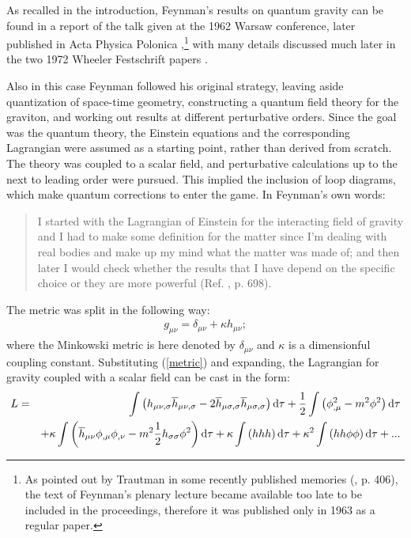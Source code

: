 \documentclass{ws-procs961x669}            %
\begin{document}
As recalled in the introduction, Feynman's results on quantum
gravity can be found in a report of the talk given at the 1962
Warsaw conference, later published in Acta Physica Polonica
\cite{Feynman:1963ax},\footnote{As pointed out by Trautman in some
recently published memories (\cite{Trautman}, p. 406), the text of
Feynman's plenary lecture became available too late to be included
in the proceedings, therefore it was published only in 1963 as a
regular paper.} with many details discussed much later in the two
1972 Wheeler Festschrift papers \cite{WheelerFest1,WheelerFest2}.

Also in this case Feynman followed his original strategy, leaving
aside quantization of space-time geometry, constructing a quantum
field theory for the graviton, and working out results at
different perturbative orders. Since the goal was the quantum
theory, the Einstein equations and the corresponding Lagrangian
were assumed as a starting point, rather than derived from
scratch. The theory was coupled to a scalar field, and
perturbative calculations up to the next to leading order were
pursued. This implied the inclusion of loop diagrams, which make
quantum corrections to enter the game. In Feynman's own words:
\begin{quote}
I started with the Lagrangian of Einstein for the interacting
field of gravity and I had to make some definition for the matter
since I'm dealing with real bodies and make up my mind what the
matter was made of; and then later I would check whether the
results that I have depend on the specific choice or they are more
powerful (Ref. , p. 698).
\end{quote}
The metric was split in the following way:
%
\begin{eqnarray}\label{metric}
g_{\mu\nu} = \delta_{\mu\nu} + \kappa h_{\mu\nu};
\end{eqnarray}
%
where the Minkowski metric is here denoted by $\delta_{\mu\nu}$
and $\kappa$ is a dimensionful coupling constant. Substituting
(\ref{metric}) and expanding, the Lagrangian for gravity coupled
with a scalar field can be cast in the form:
%
\begin{eqnarray} \label{lagrangian}
L &=& \int  \left(h_{\mu\nu,\sigma} \overline{h}_{\mu\nu,\sigma} - 2 \overline{h}_{\mu\sigma,\sigma}\overline{h}_{\mu\sigma,\sigma}\right) {\rm d} \tau + \frac{1}{2} \int \left( \phi_{,\mu}^2 - m^2 \phi^2 \right) {\rm d} \tau \\
& & + \kappa \int
\left(\overline{h}_{\mu\nu}\phi_{,\mu}\phi_{,\nu} - m^2
\frac{1}{2}{h}_{\sigma\sigma}\phi^2 \right) {\rm d} \tau + \kappa
\int \left( hhh \right){\rm d} \tau + \kappa^2 \int \left(
hh\phi\phi \right) {\rm d} \tau + ...\nonumber
\end{eqnarray}
\end{document}
